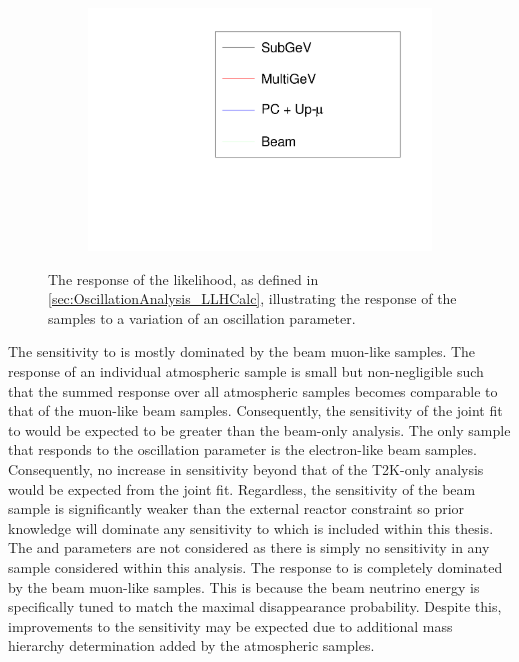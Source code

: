 \begin{figure}[h]
\begin{subfigure}[t]{0.5\textwidth}
    \includegraphics[width=\textwidth, trim={0mm 0mm 0mm 0mm}, clip,page=3]{Figures/OA/LLHScans_Osc.pdf}
  \end{subfigure}
  \caption{The response of the likelihood, as defined in \autoref{sec:OscillationAnalysis_LLHCalc}, illustrating the response of the samples to a variation of an oscillation parameter.}
  \label{fig:OscillationAnalysis_LLHScanOscPars}
\end{figure}

The sensitivity to  is mostly dominated by the beam muon-like samples. The response of an individual atmospheric sample is small but non-negligible such that the summed response over all atmospheric samples becomes comparable to that of the muon-like beam samples. Consequently, the sensitivity of the joint fit to  would be expected to be greater than the beam-only analysis. The only sample that responds to the  oscillation parameter is the electron-like beam samples. Consequently, no increase in sensitivity beyond that of the T2K-only analysis would be expected from the joint fit. Regardless, the sensitivity of the beam sample is significantly weaker than the external reactor constraint so prior knowledge will dominate any sensitivity to  which is included within this thesis. The  and  parameters are not considered as there is simply no sensitivity in any sample considered within this analysis. The response to  is completely dominated by the beam muon-like samples. This is because the beam neutrino energy is specifically tuned to match the maximal disappearance probability. Despite this, improvements to the  sensitivity may be expected due to additional mass hierarchy determination added by the atmospheric samples.

